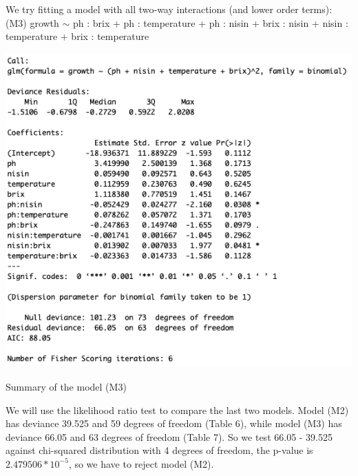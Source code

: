 \documentclass{article}
\begin{document}
We try fitting a model with all two-way interactions (and lower order terms): 
\\(M3) growth $\sim$ ph : brix + ph : temperature + ph : nisin + brix : nisin + nisin : temperature + brix : temperature\\
\begin{table}[h!]
\includegraphics[scale = 0.5]{table7.png}
\caption{Summary of the model (M3) }
\end{table}

We will use the likelihood ratio test to compare the last two models. Model (M2) has deviance 39.525  and 59  degrees of freedom (Table 6), while model (M3) has deviance 66.05 and 63  degrees of freedom (Table 7). So we test 66.05 - 39.525 against chi-squared distribution with 4 degrees of freedom, the p-value is $2.479506*10^{-5}$, so we have to reject model (M2).  
\end{document}
